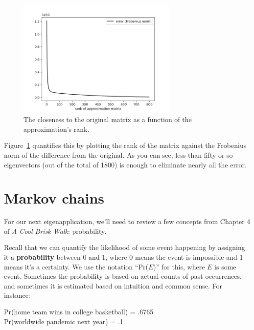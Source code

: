 \begin{alttitles}
\begin{figure}[H]
\centering
\includegraphics[width=0.7\textwidth]{frobenius.png}
\caption{The closeness to the original matrix as a function of the
approximation's rank.}
\label{fig:frobenius}
\end{figure}

Figure~\ref{fig:frobenius} quantifies this by plotting the rank of the matrix
against the Frobenius norm of the difference from the original. As you can see, 
less than fifty or so eigenvectors (out of the total of 1800) is enough to
eliminate nearly all the error.

\vfill
\pagebreak

\renewcommand{\thesubsection}{M\arabic{subsection}.}%
\section{Markov chains}


For our next eigenapplication, we'll need to review a few concepts from
Chapter 4 of \textit{A Cool Brisk Walk}: probability.

Recall that we can quantify the likelihood of some event happening by assigning
it a \textbf{probability} between 0 and 1, where 0 means the event is
impossible and 1 means it's a certainty. We use the notation ``Pr($E$)'' for
this, where $E$ is some event. Sometimes the probability is based on actual
counts of past occurrences, and sometimes it is estimated based on intuition
and common sense. For instance:

\begin{center}
Pr(home team wins in college basketball) = .6765 \\
\smallskip
Pr(worldwide pandemic next year) = .1
\end{center}


\end{alttitles}
